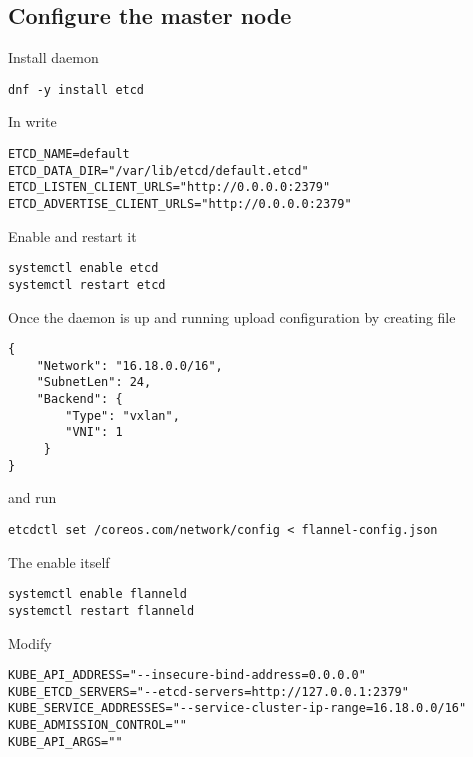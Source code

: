 \subsection{Configure the master node}
\label{subsec:setup-kuber-master}

Install  daemon

\begin{lstlisting}
dnf -y install etcd
\end{lstlisting}

In  write

\begin{lstlisting}
ETCD_NAME=default
ETCD_DATA_DIR="/var/lib/etcd/default.etcd"
ETCD_LISTEN_CLIENT_URLS="http://0.0.0.0:2379"
ETCD_ADVERTISE_CLIENT_URLS="http://0.0.0.0:2379"
\end{lstlisting}

Enable and restart it

\begin{lstlisting}
systemctl enable etcd
systemctl restart etcd
\end{lstlisting}

Once the daemon is up and running upload 
configuration by creating  file

\begin{lstlisting}
{
    "Network": "16.18.0.0/16",
    "SubnetLen": 24,
    "Backend": {
        "Type": "vxlan",
        "VNI": 1
     }
}
\end{lstlisting}

and run

\begin{lstlisting}
etcdctl set /coreos.com/network/config < flannel-config.json
\end{lstlisting}

The enable  itself

\begin{lstlisting}
systemctl enable flanneld
systemctl restart flanneld
\end{lstlisting}

Modify 

\label{kube-service-addresses}
\begin{lstlisting}
KUBE_API_ADDRESS="--insecure-bind-address=0.0.0.0"
KUBE_ETCD_SERVERS="--etcd-servers=http://127.0.0.1:2379"
KUBE_SERVICE_ADDRESSES="--service-cluster-ip-range=16.18.0.0/16"
KUBE_ADMISSION_CONTROL=""
KUBE_API_ARGS=""
\end{lstlisting}

